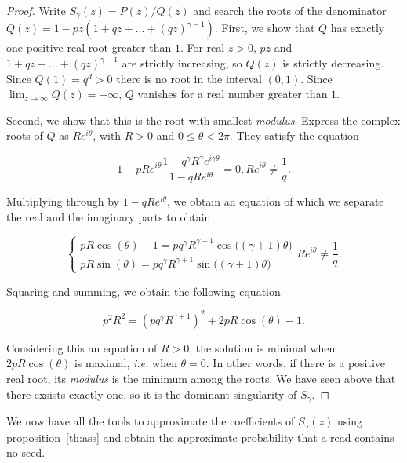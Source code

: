 \documentclass{article}
\begin{document}
\begin{proof}
Write $S_\gamma(z) = P(z)/Q(z)$ and search the roots of the denominator
$Q(z) = 1-pz(1+qz+\ldots+(qz)^{\gamma-1})$.
First, we show that $Q$ has exactly one positive real root greater than
$1$. For real $z > 0$, $pz$ and $1+qz+\ldots+(qz)^{\gamma-1}$ are strictly
increasing, so $Q(z)$ is strictly decreasing. Since $Q(1) = q^d > 0$ there
is no root in the interval $(0,1)$. Since $\lim_{z\rightarrow \infty}
Q(z) = -\infty$, $Q$ vanishes for a real number greater than $1$.

Second, we show that this is the root with smallest \textit{modulus}.
Express the complex roots of $Q$ as $Re^{i\theta}$, with $R > 0$ and $0
\leq \theta < 2\pi$. They satisfy the equation

\begin{equation*}
1-pRe^{i\theta}\frac{1-q^\gamma R^\gamma
e^{i\gamma\theta}}{1-qRe^{i\theta}} = 0,
Re^{i\theta} \neq \frac{1}{q}.
\end{equation*}

Multiplying through by $1-qRe^{i\theta}$, we obtain an equation of which
we separate the real and the imaginary parts to obtain

\begin{equation*}
\left\{
\begin{array}{ll}
pR \cos (\theta) -1 = pq^\gamma R^{\gamma+1}
\cos \big( (\gamma+1) \theta \big) \\
pR \sin (\theta) = pq^\gamma R^{\gamma+1}
\sin \big( (\gamma+1) \theta \big)
\end{array}
\right. Re^{i\theta} \neq \frac{1}{q}.
\end{equation*}

Squaring and summing, we obtain the following equation

\begin{equation}
\label{eq:Reitheta}
p^2R^2 = (pq^\gamma R^{\gamma+1})^2 + 2pR \cos(\theta) -1.
\end{equation}

Considering this an equation of $R > 0$, the solution is minimal when
$2pR\cos(\theta)$ is maximal, \textit{i.e.} when $\theta = 0$. In other
words, if there is a positive real root, its \textit{modulus} is the
minimum among the roots. We have seen above that there exsists exactly
one, so it is the dominant singularity of $S_\gamma$.
\end{proof}

We now have all the tools to approximate the coefficients of $S_\gamma(z)$
using proposition~\ref{th:ass} and obtain the approximate probability that
a read contains no seed.
\end{document}
